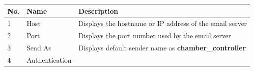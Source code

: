 \begin{longtable}[]{@{}lll@{}}
\toprule
\begin{minipage}[b]{0.04\columnwidth}\raggedright
No.\strut
\end{minipage} & \begin{minipage}[b]{0.23\columnwidth}\raggedright
Name\strut
\end{minipage} & \begin{minipage}[b]{0.65\columnwidth}\raggedright
Description\strut
\end{minipage}\tabularnewline
\midrule
\endhead
\begin{minipage}[t]{0.04\columnwidth}\raggedright
1\strut
\end{minipage} & \begin{minipage}[t]{0.23\columnwidth}\raggedright
Host\strut
\end{minipage} & \begin{minipage}[t]{0.65\columnwidth}\raggedright
Displays the hostname or IP address of the email server\strut
\end{minipage}\tabularnewline
\begin{minipage}[t]{0.04\columnwidth}\raggedright
2\strut
\end{minipage} & \begin{minipage}[t]{0.23\columnwidth}\raggedright
Port\strut
\end{minipage} & \begin{minipage}[t]{0.65\columnwidth}\raggedright
Displays the port number used by the email server\strut
\end{minipage}\tabularnewline
\begin{minipage}[t]{0.04\columnwidth}\raggedright
3\strut
\end{minipage} & \begin{minipage}[t]{0.23\columnwidth}\raggedright
Send As\strut
\end{minipage} & \begin{minipage}[t]{0.65\columnwidth}\raggedright
Displays default sender name as \textbf{chamber\_controller}\strut
\end{minipage}\tabularnewline
\begin{minipage}[t]{0.04\columnwidth}\raggedright
4\strut
\end{minipage} & \begin{minipage}[t]{0.23\columnwidth}\raggedright
Authentication\strut
\end{minipage} & \begin{minipage}[t]{0.65\columnwidth}\raggedright

\end{minipage}
\end{longtable}
